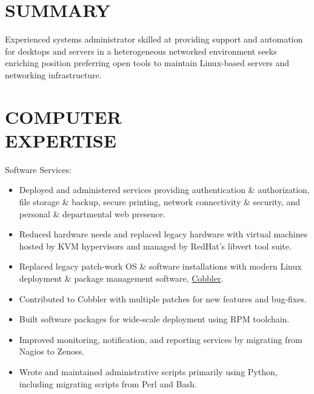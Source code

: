\documentclass[line,margin]{res}
\begin{document}

\address{3301 Elliot Ave S. Apt 1, Minneapolis, MN 55407}
\address{deisum@gmail.com 612.205.9789}
 
\begin{resume}
 
\section{SUMMARY}
    Experienced systems administrator skilled at providing support and
    automation for desktops and servers in a heterogeneous networked
    environment seeks enriching position preferring open tools to maintain
    Linux-based servers and networking infrastructure. 
 
\section{COMPUTER \\ EXPERTISE}
    Software Services:
    \vspace{2 mm}
    \begin{itemize} \itemsep -1pt %
        \item Deployed and administered services providing authentication
        \& authorization, file storage \& backup, secure printing, network
        connectivity \& security, and personal \& departmental web presence.
        \item Reduced hardware needs and replaced legacy hardware with
        virtual machines hosted by KVM hypervisors and managed by RedHat's
        libvert tool suite.
        \item Replaced legacy patch-work OS \& software installations with
        modern Linux deployment \& package management software,
        \href{http://cobbler.github.com/}{Cobbler}.
        \item Contributed to Cobbler with multiple patches for new
        features and bug-fixes.
        \item Built software packages for wide-scale deployment using RPM
        toolchain.
        \item Improved monitoring, notification, and reporting services by
        migrating from Nagios to Zenoss.
        \item Wrote and maintained administrative scripts primarily using
        Python, including migrating scripts from Perl and Bash.
    \end{itemize}


\end{resume}
\end{document}

